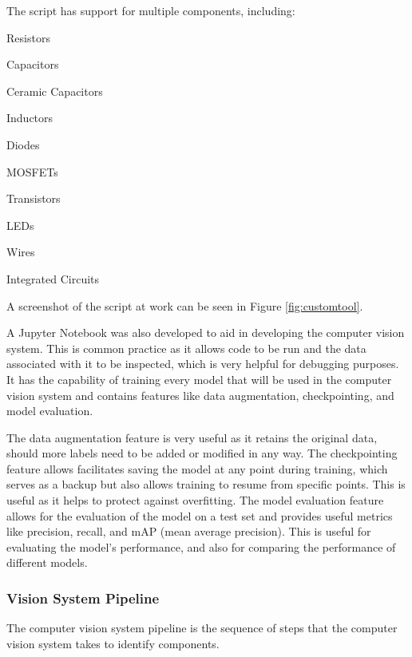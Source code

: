 The script has support for multiple components, including:
\begin{multicols}{2}
    \begin{mylist}
        \item Resistors
        \item Capacitors
        \item Ceramic Capacitors
        \item Inductors
        \item Diodes
        \item MOSFETs
        \item Transistors
        \item LEDs
        \item Wires
        \item Integrated Circuits
    \end{mylist}
\end{multicols}

\noindent
A screenshot of the script at work can be seen in Figure \ref{fig:customtool}.

A Jupyter Notebook \cite{jupyter} was also developed to aid in developing the computer vision system. This is common practice as it
allows code to be run and the data associated with it to be inspected, which is very helpful for debugging purposes. It 
has the capability of training every model that will be used in the computer vision system and contains features like
data augmentation, checkpointing, and model evaluation.

The data augmentation feature is very useful as it retains the original data, should more labels need to be added or modified in any way. The checkpointing feature allows
facilitates saving the model at any point during training, which serves as a backup but also allows training to resume from specific points. This is useful as it helps
to protect against overfitting. The model evaluation feature allows for the evaluation of the model on a test set and provides
useful metrics like precision, recall, and mAP (mean average precision). This is useful for evaluating the model's performance, and also for
comparing the performance of different models.

\subsubsection{Vision System Pipeline}
The computer vision system pipeline is the sequence of steps that the computer vision system takes to identify components.

